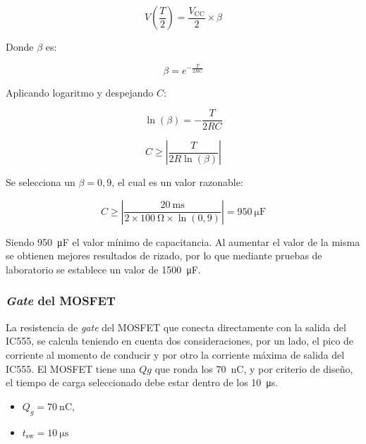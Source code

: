 \begin{equation}
V\left(\frac{T}{2}\right) = \frac{V_\mathrm{CC}}{2} \times \beta
\label{eq:inversor:vr_beta}
\end{equation}

Donde \(\beta\) es:

\begin{equation}
\beta = e^{-\frac{T}{2RC}}
\label{eq:inversor:beta}
\end{equation}

Aplicando logaritmo y despejando \({C}\):

\begin{equation}
\ln(\beta) = -\frac{T}{2RC}
\label{eq:inversor:ln_beta}
\end{equation}

\begin{equation}
C \geq \left| \frac{T}{2R \ln(\beta)} \right|
\label{eq:inversor:c_general}
\end{equation}

Se selecciona un \(\beta = 0{,}9\), el cual es un valor razonable:

\begin{equation}
C \geq \left| \frac{\SI{20}{\milli\second}}{2 \times \SI{100}{\ohm} \times \ln(0{,}9)} \right| = \SI{950}{\micro\farad}
\label{eq:inversor:c_numerico}
\end{equation}

Siendo \SI{950}{\micro\farad} el valor mínimo de capacitancia. Al aumentar el valor de la misma se obtienen mejores resultados de rizado, por lo que mediante pruebas de laboratorio se establece un valor de \SI{1500}{\micro\farad}.

\subsubsection{\textit{Gate} del MOSFET}

La resistencia de \textit{gate} del MOSFET que conecta directamente con la salida del IC555, se calcula teniendo en cuenta dos consideraciones, por un lado, el pico de corriente al momento de conducir y por otro la corriente máxima de salida del IC555.
El MOSFET tiene una \(Q{g}\) que ronda los \SI{70}{\nano\coulomb}, y por criterio de diseño, el tiempo de carga seleccionado debe estar dentro de los \SI{10}{\micro\second}.

\begin{itemize}[noitemsep]
    \item $Q_g = \SI{70}{\nano\coulomb}$, \parencite{IRFZ44N}
    \item $t_\mathrm{sw} = \SI{10}{\micro\second}$
\end{itemize}

